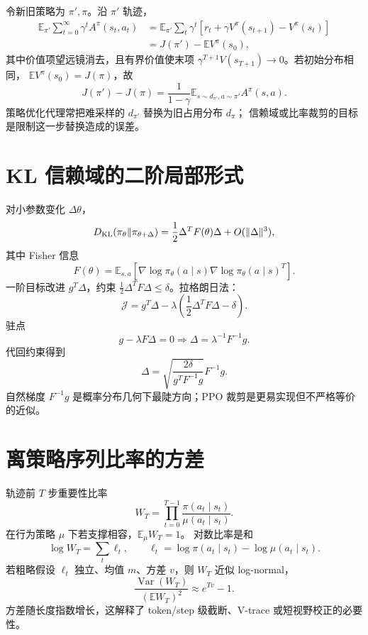 \documentclass[11pt]{article}
\numberwithin{equation}{section}
\newcommand{\E}{\mathbb{E}}
\newcommand{\1}{\mathbf{1}}
\newcommand{\Var}{\operatorname{Var}}
\begin{document}
令新旧策略为 $\pi',\pi$。沿 $\pi'$ 轨迹，
\begin{align}
 \E_{\pi'}\sum_{t=0}^{\infty}\gamma^tA^\pi(s_t,a_t)
 &=\E_{\pi'}\sum_t\gamma^t
 [r_t+\gamma V^\pi(s_{t+1})-V^\pi(s_t)]\\
 &=J(\pi')-\E V^\pi(s_0),
\end{align}
其中价值项望远镜消去，且有界价值使末项
$\gamma^{T+1}V(s_{T+1})\to0$。若初始分布相同，
$\E V^\pi(s_0)=J(\pi)$，故
\begin{equation}
 \boxed{J(\pi')-J(\pi)
 =\frac1{1-\gamma}
 \E_{s\sim d_{\pi'},a\sim\pi'}A^\pi(s,a).}
\end{equation}
策略优化代理常把难采样的 $d_{\pi'}$ 替换为旧占用分布 $d_\pi$；
信赖域或比率裁剪的目标是限制这一步替换造成的误差。

\section{KL 信赖域的二阶局部形式}

对小参数变化 $\Delta\theta$，
\begin{equation}
 D_{\rm KL}(\pi_{\theta}\|\pi_{\theta+\Delta})
 =\frac12\Delta^TF(\theta)\Delta+O(\|\Delta\|^3),
\end{equation}
其中 Fisher 信息
\begin{equation}
 F(\theta)=\E_{s,a}
 [\nabla\log\pi_\theta(a\mid s)
 \nabla\log\pi_\theta(a\mid s)^T].
\end{equation}
一阶目标改进 $g^T\Delta$，约束
$\frac12\Delta^TF\Delta\le\delta$。拉格朗日法：
\begin{equation}
 \mathcal J=g^T\Delta-\lambda
 \left(\frac12\Delta^TF\Delta-\delta\right).
\end{equation}
驻点
\begin{equation}
 g-\lambda F\Delta=0
 \Rightarrow \Delta=\lambda^{-1}F^{-1}g.
\end{equation}
代回约束得到
\begin{equation}
 \boxed{\Delta=\sqrt{\frac{2\delta}{g^TF^{-1}g}}F^{-1}g.}
\end{equation}
自然梯度 $F^{-1}g$ 是概率分布几何下最陡方向；PPO 裁剪是更易实现但不严格等价的近似。

\section{离策略序列比率的方差}

轨迹前 $T$ 步重要性比率
\begin{equation}
 W_T=\prod_{t=0}^{T-1}
 \frac{\pi(a_t\mid s_t)}{\mu(a_t\mid s_t)}.
\end{equation}
在行为策略 $\mu$ 下若支撑相容，$\E_\mu W_T=1$。
对数比率是和
\begin{equation}
 \log W_T=\sum_t\ell_t,\qquad
 \ell_t=\log\pi(a_t\mid s_t)-\log\mu(a_t\mid s_t).
\end{equation}
若粗略假设 $\ell_t$ 独立、均值 $m$、方差 $v$，则
$W_T$ 近似 log-normal，
\begin{equation}
 \frac{\Var(W_T)}{(\E W_T)^2}\approx e^{Tv}-1.
\end{equation}
方差随长度指数增长，这解释了 token/step 级截断、V-trace 或短视野校正的必要性。
\end{document}
